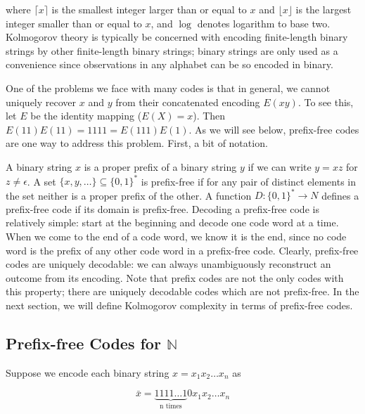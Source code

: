 \documentclass[11pt, oneside]{article}   	%
\begin{document}
\bigskip
\noindent
where $\lceil x \rceil$ is the smallest integer larger than or equal to $x$ and $\lfloor x \rfloor$ is the largest integer smaller than or equal to $x$, and $\log$ denotes logarithm to base two. 
Kolmogorov theory is  typically be concerned with encoding finite-length binary strings by other finite-length binary strings; binary strings are only used as a convenience since observations in 
any alphabet can be so encoded in binary.

\bigskip
\noindent
One of the problems we face with many codes is that in general,  we cannot uniquely recover $x$ and $y$ from their concatenated encoding $E(xy)$. To see this, let $E$ be the identity 
mapping ($E(X) = x$). Then $E(11)E(11) = 1111 = E(111)E(1)$.  As we will see below, prefix-free codes are one way to address this problem. First, a bit of notation.

\bigskip
\noindent 
A binary string $x$ is a proper prefix of a  binary string $y$ if we can write $y = xz$ for  $z \neq \epsilon$.  
 A set $\{x,y, \hdots\}  \subseteq \{0,1\}^*$ is prefix-free if for any pair of distinct elements in the set neither is a 
proper prefix of the other. A function $D : \{0,1\}^* \rightarrow N$ 
defines a prefix-free code if its domain is prefix-free. Decoding a prefix-free code is relatively simple: start at the beginning and decode one code word at a 
time. When we come to the end of a code word, we know it is the end, since no code word is the prefix of any other code word in a prefix-free code. Clearly, prefix-free codes 
are uniquely decodable: we can always unambiguously reconstruct an outcome from its encoding.  Note that prefix codes are not the only codes with this property; there are uniquely 
decodable codes which are not prefix-free. In the next section, we will define Kolmogorov complexity in terms of prefix-free codes. 

\subsection{Prefix-free Codes for $\mathbb{N}$}
Suppose we encode each binary string $x = x_1x_2 \hdots x_n$ as 
 
\begin{equation}
\label{eqn:pairing}
\bar{x} = \underbrace{1111 \hdots 1}_{\text{n times}}0 x_1x_2 \hdots x_n
\end{equation}
\end{document}

